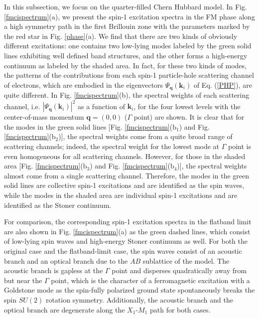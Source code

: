 \documentclass[amsmath,superscriptaddress,showpacs,aps,prb,twocolumn]{revtex4-1}
\begin{document}
\par In this subsection, we focus on the quarter-filled Chern Hubbard model. In Fig. \ref{fmcispectrum}(a), we present the spin-1 excitation spectra in the FM phase along a high symmetry path in the first Brillouin zone with the parameters marked by the red star in Fig. \ref{phase}(a). We find that there are two kinds of obviously different excitations: one contains two low-lying modes labeled by the green solid lines exhibiting well defined band structures,  and the other forms a high-energy continuum as labeled by the shaded area. In fact, for these two kinds of modes, the patterns of the contributions from each spin-1 particle-hole scattering channel of electrons, which are embodied in the eigenvectors $\Psi_{\mathbf{q}}(\mathbf{k}_i)$ of Eq. (\ref{PHP}), are quite different. In Fig. \ref{fmcispectrum}(b), the spectral weights of each scattering channel, i.e. $|\Psi_{\mathbf{q}}(\mathbf{k}_i)|^2$ as a function of $\mathbf{k}_i$, for the four lowest levels with the center-of-mass momentum $\mathbf{q}=(0,0)$ ($\Gamma$ point) are shown. It is clear that for the modes in the green solid lines [Fig. \ref{fmcispectrum}($\text{b}_1$) and Fig. \ref{fmcispectrum}($\text{b}_2$)], the spectral weights come from a quite broad range of scattering channels; indeed, the spectral weight for the lowest mode at $\Gamma$ point is even homogeneous for all scattering channels. However, for those in the shaded area [Fig. \ref{fmcispectrum}($\text{b}_3$) and Fig. \ref{fmcispectrum}($\text{b}_4$)], the spectral weights almost come from a single scattering channel. Therefore, the modes in the green solid lines are collective spin-1 excitations and are identified as the spin waves, while the modes in the shaded area are individual spin-1 excitations and are identified as the Stoner continuum.

\par For comparison, the corresponding spin-1 excitation spectra in the flatband limit are also shown in Fig. \ref{fmcispectrum}(a) as the green dashed lines, which consist of low-lying spin waves and high-energy Stoner continuum as well. For both the original case and the flatband-limit case, the spin waves consist of an acoustic branch and an optical branch due to the $AB$ sublattice of the model. The acoustic branch is gapless at the $\Gamma$ point and disperses quadratically away from but near the $\Gamma$ point, which is the character of a ferromagnetic excitation with a Goldstone mode as the spin-fully polarized ground state spontaneously breaks the spin $SU(2)$ rotation symmetry. Additionally, the acoustic branch and the optical branch are degenerate along the $X_1$-$M_1$ path for both cases.
\end{document}
